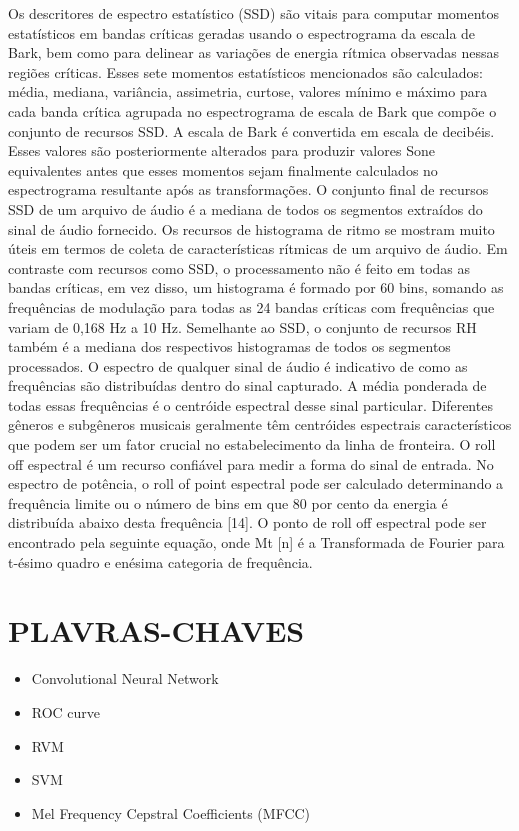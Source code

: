 \documentclass{article}
\begin{document}
Os descritores de espectro estatístico (SSD) são vitais para computar momentos estatísticos em bandas críticas geradas usando o espectrograma da escala de Bark, bem como para delinear as variações de energia rítmica observadas nessas regiões críticas. Esses sete momentos estatísticos mencionados são calculados: média, mediana, variância, assimetria, curtose, valores mínimo e máximo para cada banda crítica agrupada no espectrograma de escala de Bark que compõe o conjunto de recursos SSD. A escala de Bark é convertida em escala de decibéis. Esses valores são posteriormente alterados para produzir valores Sone equivalentes antes que esses momentos sejam finalmente calculados no espectrograma resultante após as transformações. O conjunto final de recursos SSD de um arquivo de áudio é a mediana de todos os segmentos extraídos do sinal de áudio fornecido.
Os recursos de histograma de ritmo se mostram muito úteis em termos de coleta de características rítmicas de um arquivo de áudio. Em contraste com recursos como SSD, o processamento não é feito em todas as bandas críticas, em vez disso, um histograma é formado por 60 bins, somando as frequências de modulação para todas as 24 bandas críticas com frequências que variam de 0,168 Hz a 10 Hz. Semelhante ao SSD, o conjunto de recursos RH também é a mediana dos respectivos histogramas de todos os segmentos processados.
O espectro de qualquer sinal de áudio é indicativo de como as frequências são distribuídas dentro do sinal capturado. A média ponderada de todas essas frequências é o centróide espectral desse sinal particular. Diferentes gêneros e subgêneros musicais geralmente têm centróides espectrais característicos que podem ser um fator crucial no estabelecimento da linha de fronteira.
O roll off espectral é um recurso confiável para medir a forma do sinal de entrada. No espectro de potência, o roll of point espectral pode ser calculado determinando a frequência limite ou o número de bins em que 80 por cento da energia é distribuída abaixo desta frequência [14]. O ponto de roll off espectral pode ser encontrado pela seguinte equação, onde Mt [n] é a Transformada de Fourier para t-ésimo quadro e enésima categoria de frequência.

\section{PLAVRAS-CHAVES}
\begin{itemize}
    \item Convolutional Neural Network
    \item ROC curve
    \item RVM
    \item SVM
    \item Mel Frequency Cepstral Coefficients (MFCC)
\end{itemize}
\end{document}
